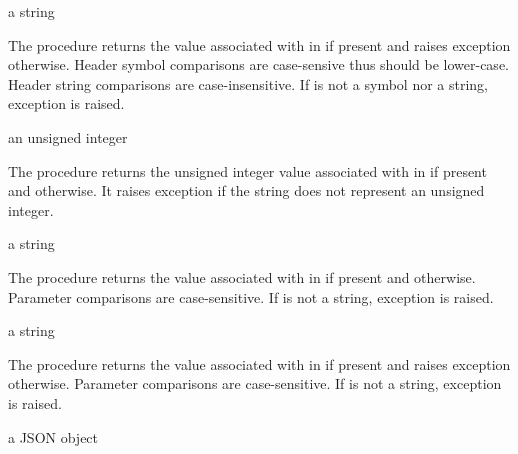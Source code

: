 \begin{procedure}
\end{procedure}
\returns{} a string

The  procedure returns the value associated with
 in  if present and raises exception
 otherwise. Header symbol
comparisons are case-sensive thus  should be
lower-case. Header string comparisons are case-insensitive. If
 is not a symbol nor a string, exception  is raised.

\begin{procedure}
\end{procedure}
\returns{} an unsigned integer \alt{} 

The  procedure returns the unsigned
integer value associated with  in  if
present and  otherwise. It raises exception
 if the 
string does not represent an unsigned integer.

\begin{procedure}
\end{procedure}
\returns{} a string \alt{} 

The  procedure returns the value associated with
 in  if present and 
otherwise. Parameter comparisons are case-sensitive. If  is
not a string, exception 
is raised.

\begin{procedure}
\end{procedure}
\returns{} a string

The  procedure returns the value associated with
 in  if present and raises exception
 otherwise. Parameter
comparisons are case-sensitive. If  is not a string,
exception  is raised.

\begin{procedure}
\end{procedure}
\returns{} a JSON object

